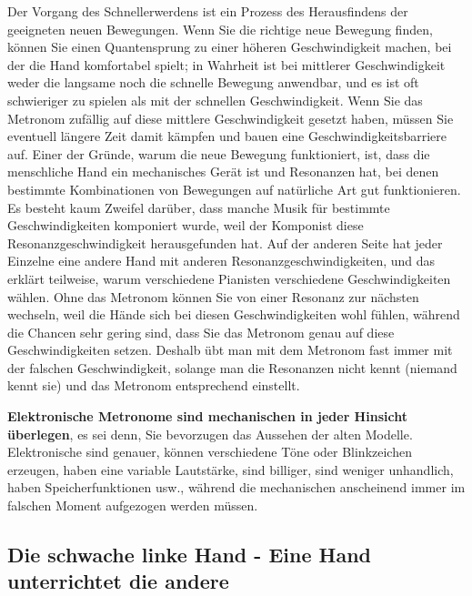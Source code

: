 Der Vorgang des Schnellerwerdens ist ein Prozess des Herausfindens der geeigneten neuen Bewegungen.
Wenn Sie die richtige neue Bewegung finden, können Sie einen Quantensprung zu einer höheren Geschwindigkeit machen, bei der die Hand komfortabel spielt; in Wahrheit ist bei mittlerer Geschwindigkeit weder die langsame noch die schnelle Bewegung anwendbar, und es ist oft schwieriger zu spielen als mit der schnellen Geschwindigkeit.
Wenn Sie das Metronom zufällig auf diese mittlere Geschwindigkeit gesetzt haben, müssen Sie eventuell längere Zeit damit kämpfen und bauen eine Geschwindigkeitsbarriere auf.
Einer der Gründe, warum die neue Bewegung funktioniert, ist, dass die menschliche Hand ein mechanisches Gerät ist und Resonanzen hat, bei denen bestimmte Kombinationen von Bewegungen auf natürliche Art gut funktionieren.
Es besteht kaum Zweifel darüber, dass manche Musik für bestimmte Geschwindigkeiten komponiert wurde, weil der Komponist diese Resonanzgeschwindigkeit herausgefunden hat.
Auf der anderen Seite hat jeder Einzelne eine andere Hand mit anderen Resonanzgeschwindigkeiten, und das erklärt teilweise, warum verschiedene Pianisten verschiedene Geschwindigkeiten wählen.
Ohne das Metronom können Sie von einer Resonanz zur nächsten wechseln, weil die Hände sich bei diesen Geschwindigkeiten wohl fühlen, während die Chancen sehr gering sind, dass Sie das Metronom genau auf diese Geschwindigkeiten setzen.
Deshalb übt man mit dem Metronom fast immer mit der falschen Geschwindigkeit, solange man die Resonanzen nicht kennt (niemand kennt sie) und das Metronom entsprechend einstellt.

\textbf{Elektronische Metronome sind mechanischen in jeder Hinsicht überlegen}, es sei denn, Sie bevorzugen das Aussehen der alten Modelle.
Elektronische sind genauer, können verschiedene Töne oder Blinkzeichen erzeugen, haben eine variable Lautstärke, sind billiger, sind weniger unhandlich, haben Speicherfunktionen usw., während die mechanischen anscheinend immer im falschen Moment aufgezogen werden müssen.


\subsection{Die schwache linke Hand - Eine Hand unterrichtet die andere}
\label{c1ii20}

